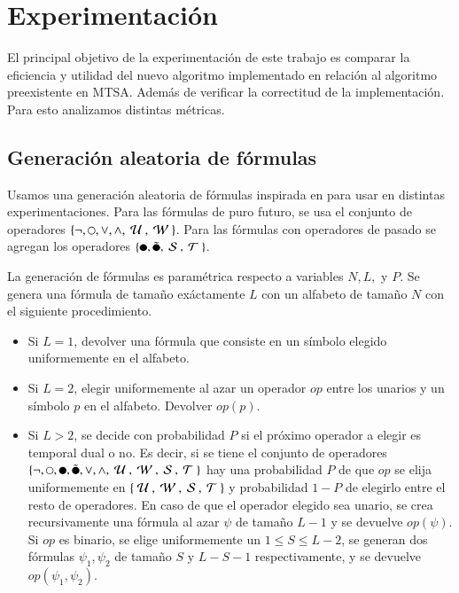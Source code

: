 \newcommand{\conj}{$\Phi_{N,L,P}$}
\newcommand{\mconj}{\Phi_{N,L,P}}

\chapter{Experimentación}

El principal objetivo de la experimentación de este trabajo es comparar la eficiencia y utilidad del nuevo algoritmo implementado en relación al algoritmo preexistente en MTSA. Además de verificar la correctitud de la implementación. Para esto analizamos distintas métricas.

\section{Generación aleatoria de fórmulas}

Usamos una generación aleatoria de fórmulas inspirada en \citet{randomBenchmark} para usar en distintas experimentaciones. Para las fórmulas de puro futuro, se usa el conjunto de operadores $\{\neg, \next, \vee, \wedge, \until, \weaku\}$. Para las fórmulas con operadores de pasado se agregan los operadores $\{\prev, \weakprev, \since, \trigger\}$.

La generación de fórmulas es paramétrica respecto a variables $N, L,$ y $P$. Se genera una fórmula de tamaño exáctamente $L$ con un alfabeto de tamaño $N$ con el siguiente procedimiento.

\begin{itemize}
	\item Si $L = 1$, devolver una fórmula que consiste en un símbolo elegido uniformemente en el alfabeto.
	\item Si $L = 2$, elegir uniformemente al azar un operador $op$ entre los unarios y un símbolo $p$ en el alfabeto. Devolver $op(p)$.
	\item Si $L > 2$, se decide con probabilidad $P$ si el próximo operador a elegir es temporal dual o no. Es decir, si se tiene el conjunto de operadores $\{\neg, \next, \prev, \weakprev, \vee, \wedge, \until, \weaku, \since, \trigger\}$ hay una probabilidad $P$ de que $op$ se elija uniformemente en $\{\text{ }\mathcal{U}\text{ }, \text{ }\mathcal{W}\text{ }, \text{ }\mathcal{S}\text{ }, \text{ }\mathcal{T}\text{ }\}$ y probabilidad $1-P$ de elegirlo entre el resto de operadores. En caso de que el operador elegido sea unario, se crea recursivamente una fórmula al azar $\psi$ de tamaño $L-1$ y se devuelve $op(\psi)$. Si $op$ es binario, se elige uniformemente un $1 \leq S \leq L - 2$, se generan dos fórmulas $\psi_1, \psi_2$ de tamaño $S$ y $L-S-1$ respectivamente, y se devuelve $op(\psi_1, \psi_2)$.
\end{itemize}

